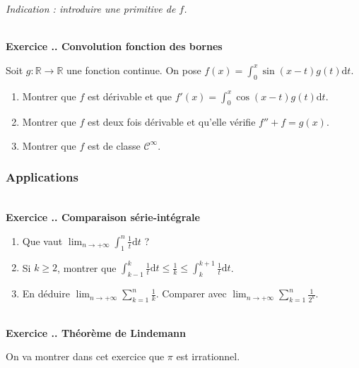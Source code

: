 \documentclass{article}
\newcommand{\di}{\mathrm{d}}
\newcommand{\mb}[1]{\mathbb{#1}}
\newcommand{\mc}[1]{\mathcal{#1}}
\newcounter{exo}
\newcommand{\exercice}[1][\null]{\textbf{\\ Exercice \thesection.\theexo. #1} \addtocounter{exo}{1}}
\begin{document}
\emph{Indication : introduire une primitive de $f$.}



\exercice[Convolution fonction des bornes]

Soit $g : \mb{R} \rightarrow \mb{R}$ une fonction continue. On pose $f(x) = \displaystyle \int_0^x \sin(x-t) g(t) \di t$.

\begin{enumerate}

\item Montrer que $f$ est dérivable et que $f'(x) =  \displaystyle \int_0^x \cos(x-t) g(t) \di t$.

\item Montrer que $f$ est deux fois dérivable et qu'elle vérifie $f'' + f = g(x)$.

\item Montrer que $f$ est de classe $\mc{C}^\infty$.

\end{enumerate}


\subsubsection{Applications}

\exercice[Comparaison série-intégrale]

\begin{enumerate}

\item Que vaut $\displaystyle \lim_{n \rightarrow + \infty} \int_1^{n} \frac{1}{t} \di  t$ ?

\item Si $k \ge 2$, montrer que $ \displaystyle \int_{k-1}^{k} \frac{1}{t} \di  t \le \frac{1}{k} \le \int_{k}^{k+1} \frac{1}{t} \di  t$.

\item En déduire $\displaystyle  \lim_{n \rightarrow + \infty} \sum_{k = 1}^{n} \frac{1}{k}$. Comparer avec $\displaystyle  \lim_{n \rightarrow + \infty} \sum_{k = 1}^{n} \frac{1}{2^k}$.
\end{enumerate}

\exercice[Théorème de Lindemann]

On va montrer dans cet exercice que $\pi$ est irrationnel.
\end{document}
